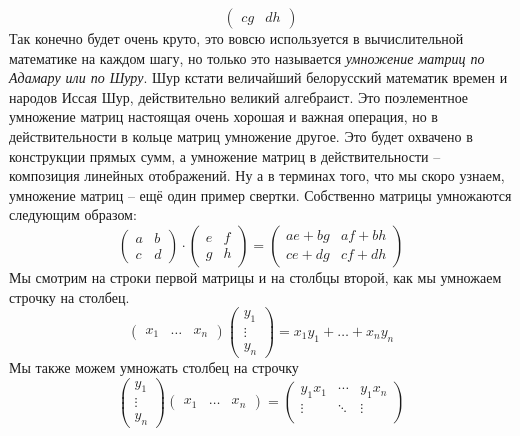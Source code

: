 \begin{itemize}
\[\begin{pmatrix}
            cg & dh
        \end{pmatrix}\]
        Так конечно будет очень круто, это вовсю используется в вычислительной
        математике на каждом шагу, но только это называется \emph{умножение 
        матриц по Адамару или по Шуру}. Шур кстати величайший белорусский
        математик времен и народов Иссая Шур, действительно великий алгебраист.
        Это поэлементное умножение матриц настоящая очень хорошая и важная
        операция, но в действительности в кольце матриц умножение другое. Это
        будет охвачено в конструкции прямых сумм, а умножение матриц в
        действительности – композиция линейных отображений. Ну а в терминах
        того, что мы скоро узнаем, умножение матриц – ещё один пример свертки.
        Собственно матрицы умножаются следующим образом:
        \[\begin{pmatrix}
            a & b\\
            c & d
        \end{pmatrix}\cdot
        \begin{pmatrix}
            e & f\\
            g & h
        \end{pmatrix} =
        \begin{pmatrix}
            ae+bg & af+bh\\
            ce+dg & cf+dh
        \end{pmatrix}\]
        Мы смотрим на строки первой матрицы и на столбцы второй, как мы умножаем
        строчку на столбец.
        \[\begin{pmatrix}x_1 & \ldots & x_n\end{pmatrix}
          \begin{pmatrix}y_1\\ \vdots\\ y_n\end{pmatrix} =
          x_1y_1+\ldots+x_ny_n\]
        Мы также можем умножать столбец на строчку
        \[\begin{pmatrix}y_1\\ \vdots\\ y_n\end{pmatrix}
          \begin{pmatrix}x_1 & \ldots & x_n\end{pmatrix} =
          \begin{pmatrix}
              y_1x_1 & \cdots & y_1x_n \\
              \vdots & \ddots & \vdots\\

\end{pmatrix}\]
\end{itemize}
